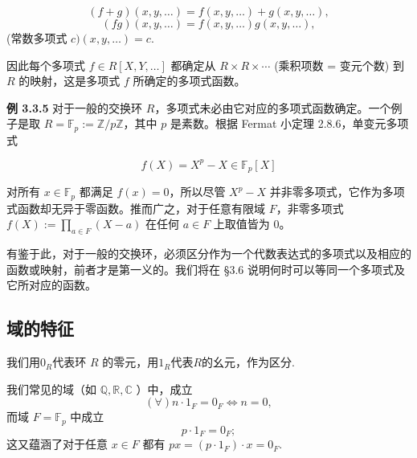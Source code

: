 \documentclass[12pt, a4paper]{ctexart}
\begin{document}
\[
(f+g)(x,y,\ldots) = f(x,y,\ldots) + g(x,y,\ldots),
\]
\[
(fg)(x,y,\ldots) = f(x,y,\ldots)g(x,y,\ldots),
\]
(常数多项式 $c)(x,y,\ldots) = c$.

因此每个多项式 $f \in R[X,Y,\ldots]$ 都确定从 $R \times R \times \cdots$ (乘积项数 = 变元个数) 到 $R$ 的映射，这是多项式 $f$ 所确定的多项式函数。

\textbf{例 3.3.5} 对于一般的交换环 $R$，多项式未必由它对应的多项式函数确定。一个例子是取 $R = \mathbb{F}_p := \mathbb{Z}/p\mathbb{Z}$，其中 $p$ 是素数。根据 Fermat 小定理 2.8.6，单变元多项式

\[
f(X) = X^p - X \in \mathbb{F}_p[X]
\]

对所有 $x \in \mathbb{F}_p$ 都满足 $f(x) = 0$，所以尽管 $X^p - X$ 并非零多项式，它作为多项式函数却无异于零函数。推而广之，对于任意有限域 $F$，非零多项式 $f(X) := \prod_{a \in F} (X - a)$ 在任何 $a \in F$ 上取值皆为 0。

有鉴于此，对于一般的交换环，必须区分作为一个代数表达式的多项式以及相应的函数或映射，前者才是第一义的。我们将在 \S3.6 说明何时可以等同一个多项式及它所对应的函数。
\subsection{域的特征}
我们用$0_R$代表环 $ R $ 的零元，用$1_R$代表$R$的幺元，作为区分. 

我们常见的域（如 $ \mathbb{Q}, \mathbb{R}, \mathbb{C} $ ）中，成立\begin{equation}
	(\forall )n \cdot 1_F = 0_F \iff n = 0,
\end{equation}  而域 $ F = \mathbb{F}_p $ 中成立\begin{equation}\label{field-char-2}
p \cdot 1_F = 0_F; 
\end{equation}
这又蕴涵了对于任意 $ x \in F $ 都有 $ px = (p \cdot 1_F) \cdot x = 0_F $. 
\end{document}
